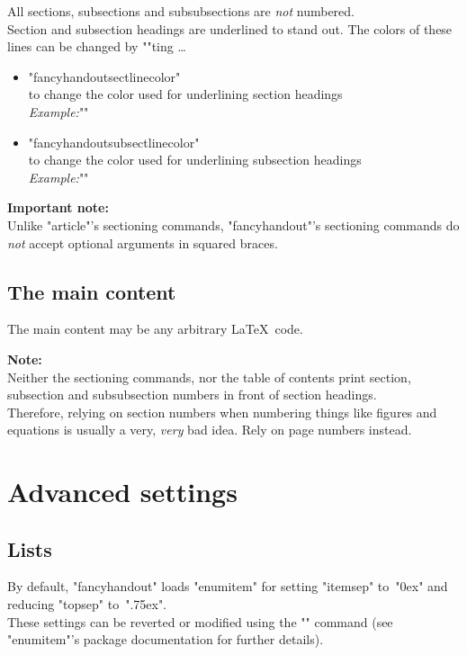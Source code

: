 \documentclass[11pt]{ltxdoc}
\begin{document}
	\medskip
	All sections, subsections and subsubsections are \emph{not} numbered. \\
	Section and subsection headings are underlined to stand out. The colors of these lines can be changed by ""ting …
	\begin{itemize}
		\item "fancyhandoutsectlinecolor" \\
			to change the color used for underlining section headings \\[\smallskipamount]
			\textit{Example:}\quad ""
		
		\item "fancyhandoutsubsectlinecolor" \\
			to change the color used for underlining subsection headings \\[\smallskipamount]
			\textit{Example:}\quad ""
	\end{itemize}
	
	\medskip
	\textbf{Important note:} \\
	Unlike "article"'s sectioning commands, "fancyhandout"'s sectioning commands do \emph{not} accept optional arguments in squared braces.
	
	
	\subsection{The main content}
	The main content may be any arbitrary \LaTeX\ code.
	
	\medskip
	\textbf{Note:} \\
	Neither the sectioning commands, nor the table of contents print section, subsection and subsubsection numbers in front of section headings. \\
	Therefore, relying on section numbers when numbering things like figures and equations is usually a very, \emph{very} bad idea. Rely on page numbers instead.
	
	
	
	
	\section{Advanced settings}
	\subsection{Lists}
	By default, "fancyhandout" loads "enumitem" for setting "itemsep" to~"0ex" and reducing "topsep" to~".75ex". \\
	\DescribeMacro{\setlist}
	These settings can be reverted or modified using the "\setlist" command (see "enumitem"'s package documentation for further details).
	
\end{document}
